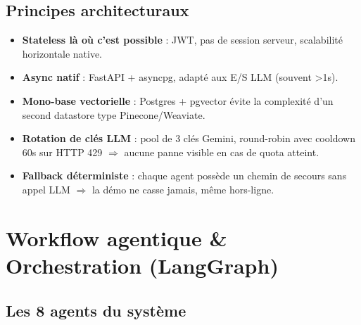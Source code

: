 \documentclass[11pt,a4paper]{article}
\begin{document}
\subsection{Principes architecturaux}

\begin{itemize}
\item \textbf{Stateless là où c'est possible} : JWT, pas de session serveur, scalabilité
horizontale native.
\item \textbf{Async natif} : FastAPI + asyncpg, adapté aux E/S LLM (souvent \textgreater 1s).
\item \textbf{Mono-base vectorielle} : Postgres + pgvector évite la complexité d'un
second datastore type Pinecone/Weaviate.
\item \textbf{Rotation de clés LLM} : pool de 3 clés Gemini, round-robin avec cooldown
60s sur HTTP 429 $\Rightarrow$ aucune panne visible en cas de quota atteint.
\item \textbf{Fallback déterministe} : chaque agent possède un chemin de secours sans
appel LLM $\Rightarrow$ la démo ne casse jamais, même hors-ligne.
\end{itemize}

\newpage

\section{Workflow agentique \& Orchestration (LangGraph)}

\subsection{Les 8 agents du système}
\end{document}
